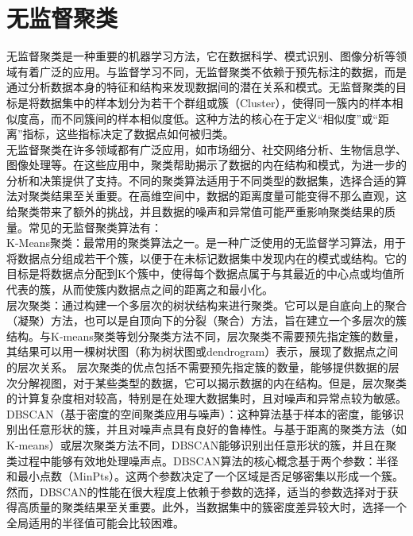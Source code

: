 \documentclass{NauThesis}
\begin{document}
\section{无监督聚类}
无监督聚类是一种重要的机器学习方法，它在数据科学、模式识别、图像分析等领域有着广泛的应用。与监督学习不同，无监督聚类不依赖于预先标注的数据，而是通过分析数据本身的特征和结构来发现数据间的潜在关系和模式。无监督聚类的目标是将数据集中的样本划分为若干个群组或簇（Cluster），使得同一簇内的样本相似度高，而不同簇间的样本相似度低。这种方法的核心在于定义“相似度”或“距离”指标，这些指标决定了数据点如何被归类。
\\\hspace*{2em}无监督聚类在许多领域都有广泛应用，如市场细分、社交网络分析、生物信息学、图像处理等。在这些应用中，聚类帮助揭示了数据的内在结构和模式，为进一步的分析和决策提供了支持。不同的聚类算法适用于不同类型的数据集，选择合适的算法对聚类结果至关重要。在高维空间中，数据的距离度量可能变得不那么直观，这给聚类带来了额外的挑战，并且数据的噪声和异常值可能严重影响聚类结果的质量。常见的无监督聚类算法有：
\\\hspace*{2em}K-Means聚类：最常用的聚类算法之一。是一种广泛使用的无监督学习算法，用于将数据点分组成若干个簇，以便于在未标记数据集中发现内在的模式或结构。它的目标是将数据点分配到K个簇中，使得每个数据点属于与其最近的中心点或均值所代表的簇，从而使簇内数据点之间的距离之和最小化。
\\\hspace*{2em}层次聚类：通过构建一个多层次的树状结构来进行聚类。它可以是自底向上的聚合（凝聚）方法，也可以是自顶向下的分裂（聚合）方法，旨在建立一个多层次的簇结构。与K-means聚类等划分聚类方法不同，层次聚类不需要预先指定簇的数量，其结果可以用一棵树状图（称为树状图或dendrogram）表示，展现了数据点之间的层次关系。
层次聚类的优点包括不需要预先指定簇的数量，能够提供数据的层次分解视图，对于某些类型的数据，它可以揭示数据的内在结构。但是，层次聚类的计算复杂度相对较高，特别是在处理大数据集时，且对噪声和异常点较为敏感。
\\\hspace*{2em}DBSCAN（基于密度的空间聚类应用与噪声）：这种算法基于样本的密度，能够识别出任意形状的簇，并且对噪声点具有良好的鲁棒性。与基于距离的聚类方法（如K-means）或层次聚类方法不同，DBSCAN能够识别出任意形状的簇，并且在聚类过程中能够有效地处理噪声点。DBSCAN算法的核心概念基于两个参数：半径和最小点数（MinPts）。这两个参数决定了一个区域是否足够密集以形成一个簇。然而，DBSCAN的性能在很大程度上依赖于参数的选择，适当的参数选择对于获得高质量的聚类结果至关重要。此外，当数据集中的簇密度差异较大时，选择一个全局适用的半径值可能会比较困难。
\end{document}
